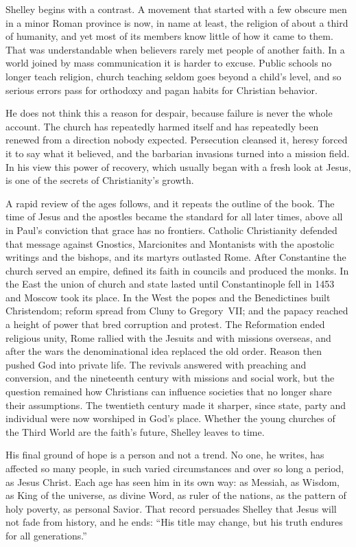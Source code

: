 Shelley begins with a contrast. A movement that started with a few obscure men in a minor Roman
province is now, in name at least, the religion of about a third of humanity, and yet most of its
members know little of how it came to them. That was understandable when believers rarely met people
of another faith. In a world joined by mass communication it is harder to excuse. Public schools no
longer teach religion, church teaching seldom goes beyond a child's level, and so serious errors pass
for orthodoxy and pagan habits for Christian behavior.

He does not think this a reason for despair, because failure is never the whole account. The church
has repeatedly harmed itself and has repeatedly been renewed from a direction nobody expected.
Persecution cleansed it, heresy forced it to say what it believed, and the barbarian invasions turned
into a mission field. In his view this power of recovery, which usually began with a fresh look at
Jesus, is one of the secrets of Christianity's growth.

A rapid review of the ages follows, and it repeats the outline of the book. The time of Jesus and the
apostles became the standard for all later times, above all in Paul's conviction that grace has no
frontiers. Catholic Christianity defended that message against Gnostics, Marcionites and Montanists
with the apostolic writings and the bishops, and its martyrs outlasted Rome. After Constantine the
church served an empire, defined its faith in councils and produced the monks. In the East the union
of church and state lasted until Constantinople fell in 1453 and Moscow took its place. In the West
the popes and the Benedictines built Christendom; reform spread from Cluny to Gregory~VII; and the
papacy reached a height of power that bred corruption and protest. The Reformation ended religious
unity, Rome rallied with the Jesuits and with missions overseas, and after the wars the denominational
idea replaced the old order. Reason then pushed God into private life. The revivals answered with
preaching and conversion, and the nineteenth century with missions and social work, but the question
remained how Christians can influence societies that no longer share their assumptions. The twentieth
century made it sharper, since state, party and individual were now worshiped in God's place. Whether
the young churches of the Third World are the faith's future, Shelley leaves to time.

His final ground of hope is a person and not a trend. No one, he writes, has affected so many people,
in such varied circumstances and over so long a period, as Jesus Christ. Each age has seen him in its
own way: as Messiah, as Wisdom, as King of the universe, as divine Word, as ruler of the nations, as
the pattern of holy poverty, as personal Savior. That record persuades Shelley that Jesus will not
fade from history, and he ends: ``His title may change, but his truth endures for all generations.''
